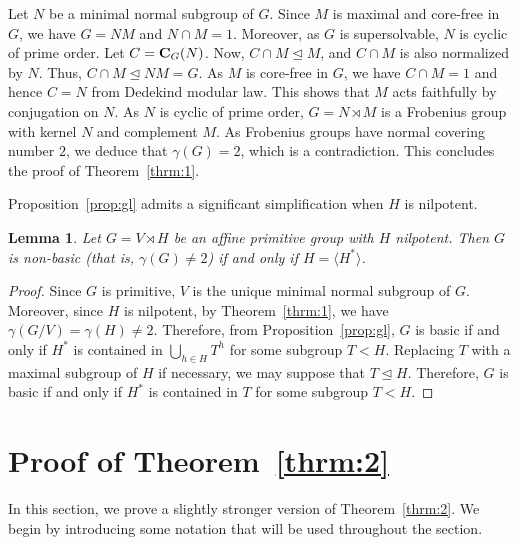 \documentclass{amsart}
\newtheorem{lemma}[theorem]{Lemma}
\begin{document}
Let $N$ be a minimal normal subgroup of $G$. Since $M$ is maximal and core-free in $G$, we have $G = NM$ and $N \cap M=1$. Moreover, as $G$ is supersolvable, $N$ is cyclic of prime order. Let $C = {\bf C}_G(N)$. Now, $C \cap M \unlhd M$, and $C \cap M$ is also normalized by $N$. Thus, $C \cap M \unlhd NM=G$. As $M$ is core-free in $G$, we have $C\cap M=1$ and hence $C=N$ from Dedekind modular law. This shows that $M$ acts faithfully by conjugation on $N$. As $N$ is cyclic of prime order, $G = N \rtimes M$ is a Frobenius group with kernel $N$ and complement $M$. As Frobenius groups have normal covering number $2$, we deduce that $\gamma(G) = 2$, which is a contradiction. This concludes the proof of Theorem~\ref{thrm:1}.

\smallskip

 Proposition~\ref{prop:gl} admits a significant simplification when $H$ is nilpotent.
\begin{lemma}\label{lemma:mercoledi0}
Let $G=V\rtimes H$ be an affine primitive group with $H$ nilpotent. Then $G$ is non-basic (that is, $\gamma(G)\ne 2$) if and only if $H=\langle H^\ast\rangle$.
\end{lemma}
\begin{proof}
Since $G$ is primitive, $V$ is the unique minimal normal subgroup of $G$. Moreover, since $H$ is nilpotent, by Theorem~\ref{thrm:1}, we have $\gamma(G/V)=\gamma(H)\ne 2$. Therefore, from Proposition~\ref{prop:gl}, $G$ is basic if and only if $H^\ast$ is contained in $\bigcup_{h \in H} T^h$ for some subgroup $T < H$. Replacing $T$ with a maximal subgroup of $H$ if necessary, we may suppose that $T\unlhd H$. Therefore,  $G$ is basic if and only if $H^\ast$ is contained in $T$ for some subgroup $T < H$.
\end{proof}


\section{Proof of Theorem~\ref{thrm:2}}\label{sec:thrm2}

In this section, we prove a slightly stronger version of Theorem~\ref{thrm:2}. We begin by introducing some notation that will be used throughout the section.
\end{document}
